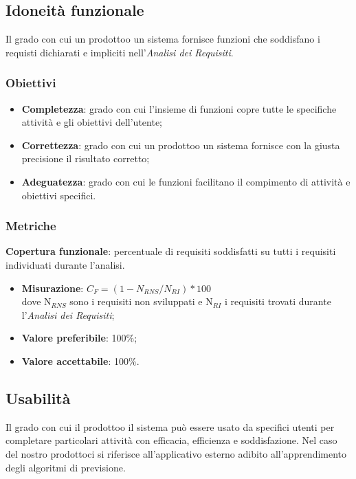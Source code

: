     \subsection{Idoneità funzionale}
        Il grado con cui un prodotto\glosp o un sistema fornisce funzioni che soddisfano i requisti dichiarati e impliciti nell'\textit{Analisi dei Requisiti}.
        \subsubsection{Obiettivi}
            \begin{itemize}
                \item \textbf{Completezza}: grado con cui l'insieme di funzioni copre tutte le specifiche attività e gli obiettivi dell'utente;
                \item \textbf{Correttezza}: grado con cui un prodotto\glosp o un sistema fornisce con la giusta precisione il risultato corretto;
                \item \textbf{Adeguatezza}: grado con cui le funzioni facilitano il compimento di attività e obiettivi specifici.
            \end{itemize}
        \subsubsection{Metriche}
            \textbf{Copertura funzionale}: percentuale di requisiti soddisfatti su tutti i requisiti individuati durante l'analisi.
                \begin{itemize}
                    \item \textbf{Misurazione}: $C_F=(1-N_{RNS}/N_{RI})*100$ \\
                    dove N$_{RNS}$ sono i requisiti non sviluppati e N$_{RI}$ i requisiti trovati durante l'\textit{Analisi dei Requisiti};
                    \item \textbf{Valore preferibile}: 100\%;
                    \item \textbf{Valore accettabile}: 100\%.
                \end{itemize}
    \subsection{Usabilità}
        Il grado con cui il prodotto\glosp o il sistema può essere usato da specifici utenti per completare particolari attività con efficacia, efficienza e soddisfazione. Nel caso del nostro prodotto\glosp ci si riferisce all'applicativo esterno adibito all'apprendimento degli algoritmi di previsione.
